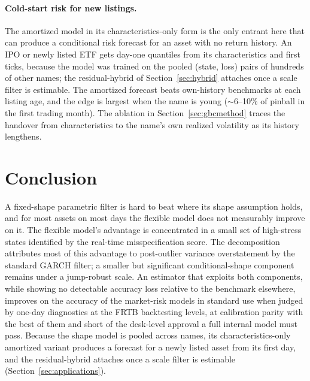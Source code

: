 \documentclass[11pt]{article}
\theoremstyle{remark}
\begin{document}
\paragraph{Cold-start risk for new listings.} The amortized model in its
characteristics-only form is the only entrant here that can produce a
conditional risk forecast for an asset with no return history. An IPO or
newly listed ETF gets day-one quantiles from its characteristics and
first ticks, because the model was trained on the pooled (state, loss)
pairs of hundreds of other names; the residual-hybrid of
Section~\ref{sec:hybrid} attaches once a scale filter is estimable. The
amortized forecast beats own-history benchmarks at each listing age, and
the edge is largest when the name is young ($\sim$6--10\% of pinball in
the first trading month). The ablation in Section~\ref{sec:gbcmethod}
traces the handover from characteristics to the name's own realized
volatility as its history lengthens.


\section{Conclusion}\label{sec:limitations}

A fixed-shape parametric filter is hard to beat where its shape assumption holds, and for most assets on most days the flexible model does not measurably improve on it. The flexible model's advantage is concentrated in a small set of high-stress states identified by the real-time misspecification score. The decomposition attributes most of this advantage to post-outlier variance overstatement by the standard GARCH filter; a smaller but significant conditional-shape component remains under a jump-robust scale. An estimator that exploits both components, while showing no detectable accuracy loss relative to the benchmark elsewhere, improves on the accuracy of the market-risk models in standard use when judged by one-day diagnostics at the FRTB backtesting levels, at calibration parity with the best of them and short of the desk-level approval a full internal model must pass. Because the shape model is pooled across names, its characteristics-only amortized variant produces a forecast for a newly listed asset from its first day, and the residual-hybrid attaches once a scale filter is estimable (Section~\ref{sec:applications}).
\end{document}
